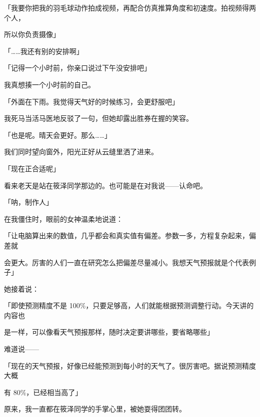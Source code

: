 「我要你把我的羽毛球动作拍成视频，再配合仿真推算角度和初速度。拍视频得两个人，\par
所以你负责摄像」\par
「……我还有别的安排啊」\par
「记得一个小时前，你亲口说过下午没安排吧」\par
我真想揍一个小时前的自己。\par
「外面在下雨。我觉得天气好的时候练习，会更舒服吧」\par
我死马当活马医地反驳了一句，但她却露出胜券在握的笑容。\par
「也是呢。晴天会更好。那么……」\par
我们同时望向窗外，阳光正好从云缝里洒了进来。\par
「现在正合适呢」\par
看来老天是站在筱泽同学那边的。也可能是在对我说——认命吧。\par
「呐，制作人」\par
在我僵住时，眼前的女神温柔地说道：\par
「让电脑算出来的数值，几乎都会和真实值有偏差。参数一多，方程复杂起来，偏差就\par
会更大。厉害的人们一直在研究怎么把偏差尽量减小。我想天气预报就是个代表例子」\par
她接着说：\par
「即使预测精度不是 100\%，只要足够高，人们就能根据预测调整行动。今天讲的内容也\par
是一样，可以像看天气预报那样，随时决定要讲哪些，要省略哪些」\par
难道说——\par
「现在的天气预报，好像已经能预测到每小时的天气了。很厉害吧。据说预测精度大概\par
有 80\%，已经相当高了」\par
原来，我一直都在筱泽同学的手掌心里，被她耍得团团转。\par

